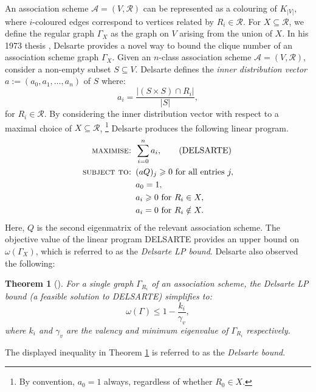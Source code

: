 \documentclass[11pt, baustms]{amsproc}
\theoremstyle{scplain}
\newtheorem{theorem}{Theorem}[section]
\renewcommand\le{\leqslant}
\renewcommand\ge{\geqslant}
\begin{document}
    An association scheme $\mathcal{A} = (V, \mathcal{R})$ can be represented as a colouring of $K_{|V|}$, where $i$-coloured edges correspond to vertices related by $R_i \in \mathcal{R}$. For $X \subseteq \mathcal{R}$, we define the regular graph $\Gamma_X$ as the graph on $V$ arising from the union of $X$. In his 1973 thesis \cite{delsarte}, Delsarte provides a novel way to bound the clique number of an association scheme graph $\Gamma_X$. Given an $n$-class association scheme $\mathcal{A} =(V, \mathcal{R})$, consider a non-empty subset $S \subseteq V$. Delsarte defines the \textit{inner distribution vector}  $a := (a_0,a_1,\dots, a_n)$ of $S$ where: 
    \begin{equation*} a_i = \frac{|(S \times S) \cap R_i|}{|S|},
	\end{equation*}
	 for $R_i \in \mathcal{R}$. By considering the inner distribution vector with respect to a maximal choice of $X \subseteq \mathcal{R}$, \footnote{By convention, $a_0=1$ always, regardless of whether $R_0 \in X$.} Delsarte produces the following linear program.
    \begin{align*}
	\textsc{maximise: }  & \sum_{i=0}^{n} a_i, \tag{DELSARTE}\\
	\textsc{subject to: } & (a Q)_j \ge 0 \textnormal{ for all entries } j, \\
	& a_0 = 1, \\
	& a_i \ge 0 \textnormal{ for } R_i \in X,\\
	& a_i = 0 \textnormal{ for } R_i \notin X. 
	\end{align*}
	Here, $Q$ is the second eigenmatrix of the relevant association scheme. The objective value of the linear program DELSARTE provides an upper bound on $\omega(\Gamma_X)$, which is referred to as the \textit{Delsarte LP bound}. Delsarte also observed the following:
    
	\begin{theorem}[{\cite[3.23]{delsarte}}]
	\label{DB}
	For a single graph $\Gamma_{R_i}$ of an association scheme, the Delsarte LP bound (a feasible solution to \textnormal{DELSARTE}) simplifies to:
	\begin{equation*} 
		\omega(\Gamma) \le 1 - \frac{k_i}{\gamma_{v}}, 
	\end{equation*}
	where $k_i$ and $\gamma_v$ are the valency and minimum eigenvalue of $\Gamma_{R_i}$ respectively.
	\end{theorem}

   The displayed inequality in Theorem \ref{DB} is referred to as the \emph{Delsarte bound}. 
\end{document}
